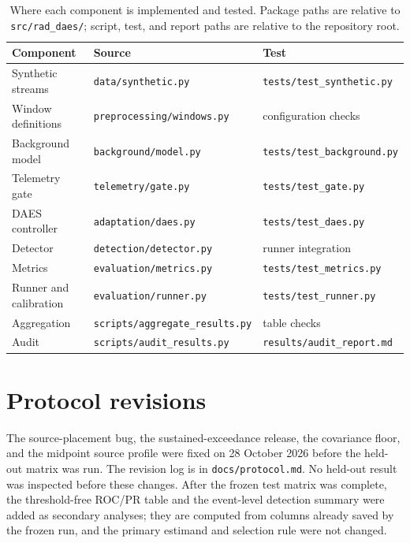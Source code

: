 \documentclass[11pt]{article}
\begin{document}
\begin{table}[htbp]
\centering
\caption{Where each component is implemented and tested. Package paths are relative to \texttt{src/rad\_daes/}; script, test, and report paths are relative to the repository root.}
\small
\setlength{\tabcolsep}{4pt}
\begin{tabular}{lll}
\toprule
Component & Source & Test \\
\midrule
Synthetic streams & \texttt{data/synthetic.py} & \texttt{tests/test\_synthetic.py} \\
Window definitions & \texttt{preprocessing/windows.py} & configuration checks \\
Background model & \texttt{background/model.py} & \texttt{tests/test\_background.py} \\
Telemetry gate & \texttt{telemetry/gate.py} & \texttt{tests/test\_gate.py} \\
DAES controller & \texttt{adaptation/daes.py} & \texttt{tests/test\_daes.py} \\
Detector & \texttt{detection/detector.py} & runner integration \\
Metrics & \texttt{evaluation/metrics.py} & \texttt{tests/test\_metrics.py} \\
Runner and calibration & \texttt{evaluation/runner.py} & \texttt{tests/test\_runner.py} \\
Aggregation & \texttt{scripts/aggregate\_results.py} & table checks \\
Audit & \texttt{scripts/audit\_results.py} & \texttt{results/audit\_report.md} \\
\bottomrule
\end{tabular}
\end{table}

\section{Protocol revisions}

The source-placement bug, the sustained-exceedance release, the covariance floor, and the midpoint source profile were fixed on 28 October 2026 before the held-out matrix was run. The revision log is in \texttt{docs/protocol.md}. No held-out result was inspected before these changes. After the frozen test matrix was complete, the threshold-free ROC/PR table and the event-level detection summary were added as secondary analyses; they are computed from columns already saved by the frozen run, and the primary estimand and selection rule were not changed.
\end{document}

